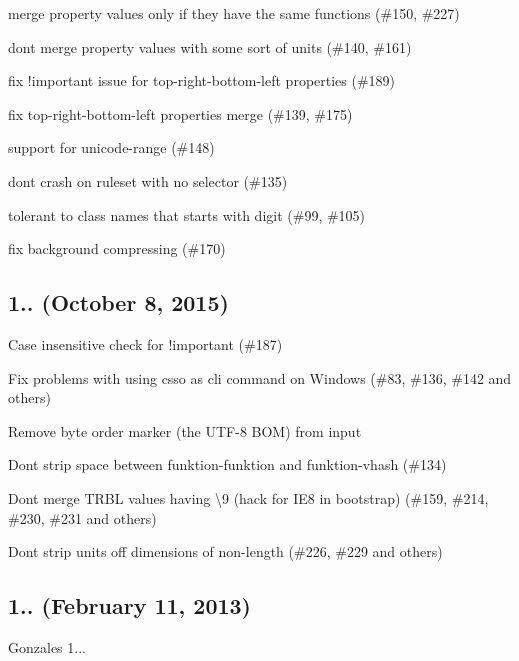 \begin{DoxyItemize}
\item merge property values only if they have the same functions (\#150, \#227)
\item don\textquotesingle{}t merge property values with some sort of units (\#140, \#161)
\item fix {\ttfamily !important} issue for {\ttfamily top-\/right-\/bottom-\/left} properties (\#189)
\item fix {\ttfamily top-\/right-\/bottom-\/left} properties merge (\#139, \#175)
\item support for unicode-\/range (\#148)
\item don\textquotesingle{}t crash on ruleset with no selector (\#135)
\item tolerant to class names that starts with digit (\#99, \#105)
\item fix background compressing (\#170)
\end{DoxyItemize}

\subsection*{1.. (October 8, 2015)}


\begin{DoxyItemize}
\item Case insensitive check for {\ttfamily !important} (\#187)
\item Fix problems with using {\ttfamily csso} as cli command on Windows (\#83, \#136, \#142 and others)
\item Remove byte order marker (the U\+T\+F-\/8 B\+OM) from input
\item Don\textquotesingle{}t strip space between funktion-\/funktion and funktion-\/vhash (\#134)
\item Don\textquotesingle{}t merge T\+R\+BL values having \textbackslash{}9 (hack for I\+E8 in bootstrap) (\#159, \#214, \#230, \#231 and others)
\item Don\textquotesingle{}t strip units off dimensions of non-\/length (\#226, \#229 and others)
\end{DoxyItemize}

\subsection*{1.. (February 11, 2013)}


\begin{DoxyItemize}
\item Gonzales 1...
\end{DoxyItemize}

